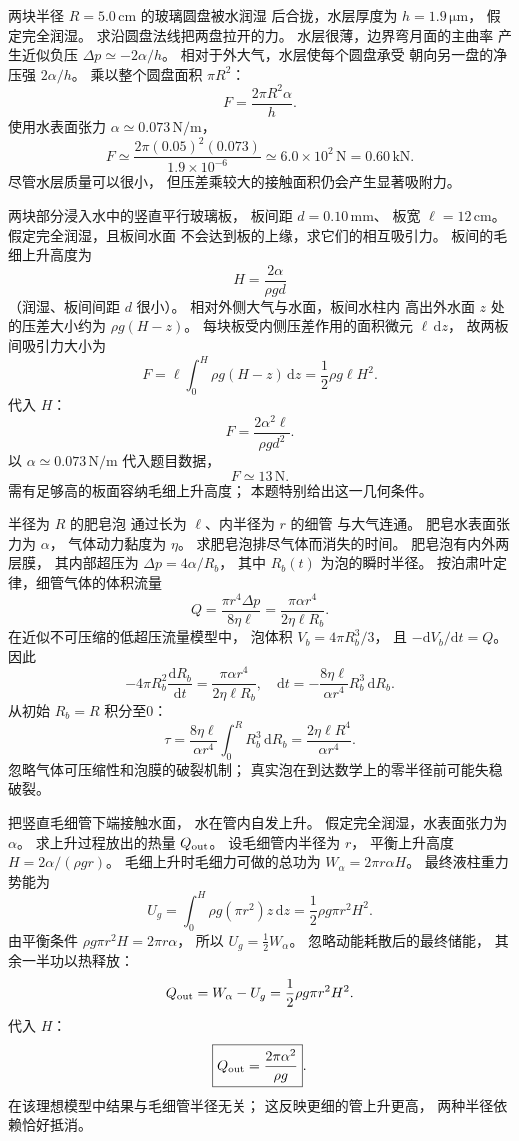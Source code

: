 两块半径
$R=5.0\,\mathrm{cm}$ 的玻璃圆盘被水润湿
后合拢，水层厚度为
$h=1.9\,\mathrm{\mu m}$，
假定完全润湿。
求沿圆盘法线把两盘拉开的力。
\exsolution
水层很薄，边界弯月面的主曲率
产生近似负压
$\Delta p\simeq-2\alpha/h$。
相对于外大气，水层使每个圆盘承受
朝向另一盘的净压强 $2\alpha/h$。
乘以整个圆盘面积 $\pi R^2$：
\[
\boxed{F=\frac{2\pi R^2\alpha}{h}}.
\]
使用水表面张力
$\alpha\simeq0.073\,\mathrm{N/m}$，
\[
\boxed{F\simeq
\frac{2\pi(0.05)^2(0.073)}{1.9\times10^{-6}}
\simeq6.0\times10^2\,\mathrm N=0.60\,\mathrm{kN}}.
\]
\excheck 尽管水层质量可以很小，
但压差乘较大的接触面积仍会产生显著吸附力。

两块部分浸入水中的竖直平行玻璃板，
板间距
$d=0.10\,\mathrm{mm}$、
板宽 $\ell=12\,\mathrm{cm}$。
假定完全润湿，且板间水面
不会达到板的上缘，求它们的相互吸引力。
\exsolution
板间的毛细上升高度为
\[
H=\frac{2\alpha}{\rho gd}
\]
（润湿、板间间距 $d$ 很小）。
相对外侧大气与水面，板间水柱内
高出外水面 $z$ 处的压差大小约为
$\rho g(H-z)$。
每块板受内侧压差作用的面积微元
$\ell\,\mathrm dz$，
故两板间吸引力大小为
\[
F=\ell\int_0^H\rho g(H-z)\,\mathrm dz
=\frac12\rho g\ell H^2.
\]
代入 $H$：
\[
\boxed{F=\frac{2\alpha^2\ell}{\rho gd^2}}.
\]
以 $\alpha\simeq0.073\,\mathrm{N/m}$
代入题目数据，
\[
\boxed{F\simeq13\,\mathrm N}.
\]
\excheck 需有足够高的板面容纳毛细上升高度；
本题特别给出这一几何条件。

半径为 $R$ 的肥皂泡
通过长为 $\ell$、内半径为 $r$ 的细管
与大气连通。
肥皂水表面张力为 $\alpha$，
气体动力黏度为 $\eta$。
求肥皂泡排尽气体而消失的时间。
\exsolution
肥皂泡有内外两层膜，
其内部超压为
$\Delta p=4\alpha/R_b$，
其中 $R_b(t)$ 为泡的瞬时半径。
按泊肃叶定律，细管气体的体积流量
\[
Q=\frac{\pi r^4\Delta p}{8\eta\ell}
=\frac{\pi\alpha r^4}{2\eta\ell R_b}.
\]
在近似不可压缩的低超压流量模型中，
泡体积
$V_b=4\pi R_b^3/3$，
且 $-\mathrm dV_b/\mathrm dt=Q$。
因此
\[
-4\pi R_b^2\frac{\mathrm dR_b}{\mathrm dt}
=\frac{\pi\alpha r^4}{2\eta\ell R_b},
\quad
\mathrm dt=-\frac{8\eta\ell}{\alpha r^4}R_b^3\,\mathrm dR_b.
\]
从初始 $R_b=R$ 积分至0：
\[
\boxed{\tau=\frac{8\eta\ell}{\alpha r^4}
\int_0^R R_b^3\,\mathrm dR_b
=\frac{2\eta\ell R^4}{\alpha r^4}}.
\]
\excheck 忽略气体可压缩性和泡膜的破裂机制；
真实泡在到达数学上的零半径前可能失稳破裂。

把竖直毛细管下端接触水面，
水在管内自发上升。
假定完全润湿，水表面张力为 $\alpha$。
求上升过程放出的热量 $Q_{\rm out}$。
\exsolution
设毛细管内半径为 $r$，
平衡上升高度
$H=2\alpha/(\rho gr)$。
毛细上升时毛细力可做的总功为
$W_\alpha=2\pi r\alpha H$。
最终液柱重力势能为
\[
U_g=\int_0^H\rho g(\pi r^2)z\,\mathrm dz
=\frac12\rho g\pi r^2H^2.
\]
由平衡条件
$\rho g\pi r^2H=2\pi r\alpha$，
所以
$U_g=\tfrac12W_\alpha$。
忽略动能耗散后的最终储能，
其余一半功以热释放：
\[
Q_{\rm out}=W_\alpha-U_g
=\frac12\rho g\pi r^2H^2.
\]
代入 $H$：
\[
\boxed{Q_{\rm out}=\frac{2\pi\alpha^2}{\rho g}}.
\]
\excheck 在该理想模型中结果与毛细管半径无关；
这反映更细的管上升更高，
两种半径依赖恰好抵消。

